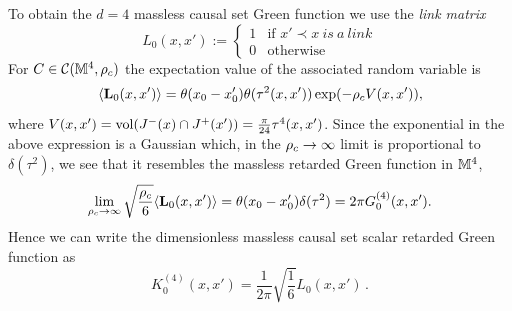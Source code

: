 To obtain the $d=4$ massless causal set Green function we use the \emph{link matrix}
\begin{equation}
L_0(x,x'):=
\left\{
        \begin{array}{ll}
                1  & \mbox{if } x' \prec x {\mathrm \ is \ a \ link}\\
                0 & \mbox{} \mathrm{otherwise}
        \end{array}
      \right. 
      \label{eq:linkm}
    \end{equation}
  For $C \in \mathcal C(\mathbb M^4,\rho_c)$ the expectation value of the associated random variable is 
\begin{equation}
\label{linkexp}
\langle {\mathbf L_0(x,x')} \rangle=\theta(x_0-x'_0) \theta( \tau^2(x,x'))\exp(-\rho_c V(x,x')),
\end{equation}
where $V(x,x') = \mathrm{vol}(J^-(x) \cap J^+(x')) = \frac{\pi}{24}\tau^4(x,x')$. Since the exponential in the above expression
is a Gaussian which, in the $\rho_c \rightarrow \infty $ limit  is proportional to $\delta(\tau^2)$, we see that it resembles the
massless retarded Green function in $\mathbb M^4$, 
\begin{equation} 
\label{linklim}
\lim_{\rho_c \rightarrow \infty} {\sqrt{\frac{\rho_c}{6}}\langle {\mathbf L_0(x,x')} \rangle} =  \theta(x_0-x_0') \delta(\tau^2) =2 \pi
G^{(4)}_0(x,x'). 
\end{equation} 
Hence we can write the  dimensionless massless causal set scalar retarded Green function as \citep{johnston,johnstonthesis} 
\begin{equation}
\label{eq:massless4d}
K^{(4)}_0(x,x')= \frac{1}{2 \pi} \sqrt{\frac{1}{6}} L_0(x,x')\,. 
\end{equation} 

